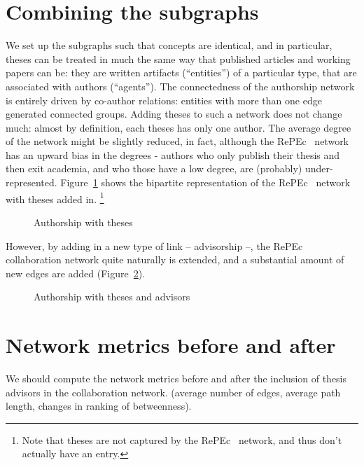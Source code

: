 \documentclass[x11names]{article}
\newcommand{\repec}{RePEc}
\begin{document}
\section{Combining the subgraphs}
\label{sec:combine}
We set up the subgraphs such that concepts are identical, and in particular, theses can be treated in much the same way that published articles and working papers can be: they are written artifacts (``entities'') of a particular type, that are associated with authors (``agents''). The connectedness of the authorship network is entirely driven by co-author relations: entities with more than one edge generated connected groups. Adding theses to such a network does not change much: almost by definition, each theses has only one author. The average degree of the network might be slightly reduced, in fact, although the \repec~ network has an upward bias in the degrees - authors who only publish their thesis and then exit academia, and who those have a low degree, are (probably) under-represented. Figure~\ref{fig:author:theses} shows the bipartite representation of the \repec~ network with theses added in.%
\footnote{Note that theses are not captured by the \repec~ network, and thus don't actually have an entry.}

\begin{figure}[ht]
\caption{Authorship with theses}\label{fig:author:theses}

\end{figure}

However, by adding in a new type of link -- advisorship --, the \repec~ collaboration network quite naturally is extended, and a substantial amount of new edges are added (Figure~\ref{fig:author:theses:complete}).
\begin{figure}[ht]
\caption{Authorship with theses and advisors}\label{fig:author:theses:complete}

\end{figure}

\clearpage

\section{Network metrics before and after}
\label{sec:metrics}

We should compute the network metrics before and after the inclusion of thesis advisors in the collaboration network. (average number of edges, average path length, changes in ranking of betweenness).
\clearpage
\end{document}
